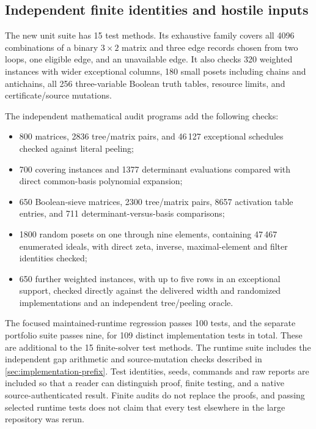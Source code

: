 \subsection{Independent finite identities and hostile inputs}

The new unit suite has 15 test methods.  Its exhaustive family covers all
4096 combinations of a binary $3\times2$ matrix and three edge records
chosen from two loops, one eligible edge, and an unavailable edge.  It also
checks 320 weighted instances with wider exceptional columns, 180 small
posets including chains and antichains, all 256 three-variable Boolean
truth tables, resource limits, and certificate/source mutations.

The independent mathematical audit programs add the following checks:

\begin{itemize}
\item 800 matrices, 2836 tree/matrix pairs, and 46\,127 exceptional
  schedules checked against literal peeling;
\item 700 covering instances and 1377 determinant evaluations compared
  with direct common-basis polynomial expansion;
\item 650 Boolean-sieve matrices, 2300 tree/matrix pairs, 8657 activation
  table entries, and 711 determinant-versus-basis comparisons;
\item 1800 random posets on one through nine elements, containing 47\,467
  enumerated ideals, with direct zeta, inverse, maximal-element and filter
  identities checked;
\item 650 further weighted instances, with up to five rows in an
  exceptional support, checked directly against the delivered width and
  randomized implementations and an independent tree/peeling oracle.
\end{itemize}

The focused maintained-runtime regression passes 100 tests, and the separate
portfolio suite passes nine, for 109 distinct implementation tests in total.
These are additional to the 15 finite-solver test methods.  The runtime suite includes
the independent gap arithmetic and source-mutation checks described in
\cref{sec:implementation-prefix}.  Test identities, seeds, commands and raw
reports are included so that a reader can distinguish proof, finite testing,
and a native source-authenticated result.  Finite audits do not replace the
proofs, and passing selected runtime tests does not claim that every test
elsewhere in the large repository was rerun.
